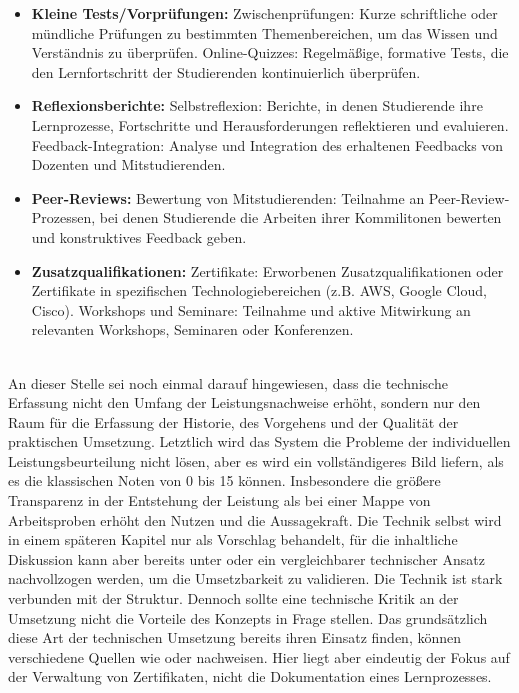 \documentclass[conference]{IEEEtran}
\begin{document}
\begin{itemize}[leftmargin=*]
    \item \textbf{Kleine Tests/Vorprüfungen:}
    \newline Zwischenprüfungen: Kurze schriftliche oder mündliche Prüfungen zu bestimmten Themenbereichen, um das Wissen und Verständnis zu überprüfen.
    \newline Online-Quizzes: Regelmäßige, formative Tests, die den Lernfortschritt der Studierenden kontinuierlich überprüfen.

    \item \textbf{Reflexionsberichte:}
    \newline Selbstreflexion: Berichte, in denen Studierende ihre Lernprozesse, Fortschritte und Herausforderungen reflektieren und evaluieren.
    \newline Feedback-Integration: Analyse und Integration des erhaltenen Feedbacks von Dozenten und Mitstudierenden.

    \item \textbf{Peer-Reviews:}
    \newline Bewertung von Mitstudierenden: Teilnahme an Peer-Review-Prozessen, bei denen Studierende die Arbeiten ihrer Kommilitonen bewerten und konstruktives Feedback geben.

    \item \textbf{Zusatzqualifikationen:}
    \newline Zertifikate: Erworbenen Zusatzqualifikationen oder Zertifikate in spezifischen Technologiebereichen (z.B. AWS, Google Cloud, Cisco).
    \newline Workshops und Seminare: Teilnahme und aktive Mitwirkung an relevanten Workshops, Seminaren oder Konferenzen.
\end{itemize}
\mbox{}\\
An dieser Stelle sei noch einmal darauf hingewiesen, dass die technische Erfassung nicht den Umfang der Leistungsnachweise erhöht, sondern nur den Raum für die Erfassung der Historie, des Vorgehens und der Qualität der praktischen Umsetzung.
Letztlich wird das System die Probleme der individuellen Leistungsbeurteilung nicht lösen, aber es wird ein vollständigeres Bild liefern, als es die klassischen Noten von 0 bis 15 können. Insbesondere die größere Transparenz in der Entstehung der Leistung als bei einer Mappe von Arbeitsproben erhöht den Nutzen und die Aussagekraft. 
Die Technik selbst wird in einem späteren Kapitel nur als Vorschlag behandelt, für die inhaltliche Diskussion kann aber bereits unter \cite{Idee} oder \cite{brazil} ein vergleichbarer technischer Ansatz nachvollzogen werden, um die Umsetzbarkeit zu validieren. Die Technik ist stark verbunden mit der Struktur. Dennoch sollte eine technische Kritik an der Umsetzung  nicht die Vorteile des Konzepts in Frage stellen. Das grundsätzlich diese Art der technischen Umsetzung bereits ihren Einsatz finden, können verschiedene Quellen wie \cite{blockcerts2024} oder \cite{blockchaincert2024} nachweisen. Hier liegt aber eindeutig der Fokus auf der Verwaltung von Zertifikaten, nicht die Dokumentation eines Lernprozesses.  
\end{document}
